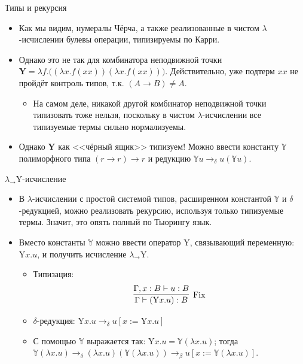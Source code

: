 \documentclass[xcolor=dvipsnames]{beamer}
\newcommand{\Yx}{\mathbf{Y}}
\newcommand{\Yb}{\mathbb{Y}}
\begin{document}
\begin{frame}{Типы и рекурсия}

\begin{itemize}[<+->]
 \item Как мы видим, нумералы Чёрча, а также реализованные в чистом $\lambda$-исчислении булевы операции, типизируемы по Карри.
 
 \item Однако это не так для комбинатора неподвижной точки $\Yx = \lambda f . \bigl(
 (\lambda x. f(xx)) (\lambda x. f(xx)) \bigr)$.
 Действительно, уже подтерм $xx$ не пройдёт контроль типов, т.к. $(A \to B) \ne A$.
 
 \begin{itemize}
 \item На самом деле, никакой другой комбинатор неподвижной точки типизовать тоже нельзя, поскольку в чистом $\lambda$-исчислении все типизуемые термы сильно нормализуемы.
\end{itemize}

\item Однако $\Yx$ как <<чёрный ящик>> типизуем! Можно ввести константу $\Yb$ полиморфного типа $(r \to r) \to r$ и редукцию $\Yb u \to_\delta u (\Yb u)$.
\end{itemize}
 
\end{frame}


\begin{frame}{$\lambda_\to \mathrm{Y}$-исчисление}

\begin{itemize}[<+->]
 \item В $\lambda$-исчислении с простой системой типов, расширенном константой $\Yb$ и $\delta$-редукцией, можно реализовать рекурсию, используя только типизуемые термы. Значит, это опять полный по Тьюрингу язык.
 \item Вместо константы $\Yb$ можно ввести оператор $\mathrm{Y}$, связывающий переменную: $\mathrm{Y} x. u$, и получить исчисление 
 $\lambda_\to \mathrm{Y}$.
 \begin{itemize}
 \item Типизация: 
 \[
\infer[\mathrm{Fix}]
{\Gamma \vdash (\mathrm{Y} x. u) : B}
{\Gamma, x:B \vdash u : B} 
 \]
 \item $\delta$-редукция: 
 \( \mathrm{Y} x. u \to_\delta 
 u[x := \mathrm{Y}x. u] \)
 \item С помощью $\Yb$ выражается так:
 $\mathrm{Y} x. u = \Yb (\lambda x. u)$; тогда
 $\Yb (\lambda x. u) \to_\delta (\lambda x.u) (\Yb (\lambda x. u)) \to_\beta 
 u[x := \Yb (\lambda x. u)]$.
 \end{itemize}
\end{itemize}

\end{frame}
\end{document}
